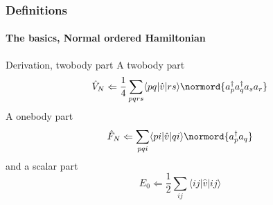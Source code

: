 \documentclass[compress]{beamer}
\newcommand*{\ket}[1]{|#1\rangle}
\newcommand*{\bra}[1]{\langle#1|}
\newcommand{\element}[3]
        {\bra{#1}#2\ket{#3}}
\begin{document}
\begin{frame}[fragile]
    \frametitle{Definitions}
    \framesubtitle{The basics, Normal ordered Hamiltonian}

    \begin{block}{Derivation, twobody part}
    A twobody part
    \begin{equation*}
            \hat{V}_N \Leftarrow \frac{1}{4} \sum_{pqrs} \element{pq}{\hat{v}}{rs} 
                \normord{a^\dagger_p a^\dagger_q a_s  a_r}
    \end{equation*}
    A onebody part
    \begin{equation*}
            \hat{F}_N \Leftarrow \sum_{pqi} \element{pi}{\hat{v}}{qi} \normord{a^\dagger_p a_q}
    \end{equation*}
    and a scalar part
    \begin{equation*}
                E_0 \Leftarrow \frac{1}{2} \sum_{ij} \element{ij}{\hat{v}}{ij}
    \end{equation*}



    \end{block}
\end{frame}
\end{document}
